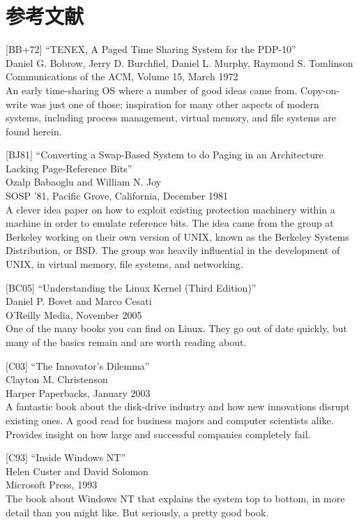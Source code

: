 \hypertarget{ux53c2ux8003ux6587ux732e-15}{%
\section*{参考文献}\label{ux53c2ux8003ux6587ux732e-15}}

{[}BB+72{]} ``TENEX, A Paged Time Sharing System for the PDP-10''\\
Daniel G. Bobrow, Jerry D. Burchfiel, Daniel L. Murphy, Raymond S.
Tomlinson\\
Communications of the ACM, Volume 15, March 1972\\
An early time-sharing OS where a number of good ideas came from.
Copy-on-write was just one of those; inspiration for many other aspects
of modern systems, including process management, virtual memory, and
file systems are found herein.

{[}BJ81{]} ``Converting a Swap-Based System to do Paging in an
Architecture Lacking Page-Reference Bits''\\
Ozalp Babaoglu and William N. Joy\\
SOSP '81, Pacific Grove, California, December 1981\\
A clever idea paper on how to exploit existing protection machinery
within a machine in order to emulate reference bits. The idea came from
the group at Berkeley working on their own version of UNIX, known as the
Berkeley Systems Distribution, or BSD. The group was heavily influential
in the development of UNIX, in virtual memory, file systems, and
networking.

{[}BC05{]} ``Understanding the Linux Kernel (Third Edition)''\\
Daniel P. Bovet and Marco Cesati\\
O'Reilly Media, November 2005\\
One of the many books you can find on Linux. They go out of date
quickly, but many of the basics remain and are worth reading about.

{[}C03{]} ``The Innovator's Dilemma''\\
Clayton M. Christenson\\
Harper Paperbacks, January 2003\\
A fantastic book about the disk-drive industry and how new innovations
disrupt existing ones. A good read for business majors and computer
scientists alike. Provides insight on how large and successful companies
completely fail.

{[}C93{]} ``Inside Windows NT''\\
Helen Custer and David Solomon\\
Microsoft Press, 1993\\
The book about Windows NT that explains the system top to bottom, in
more detail than you might like. But seriously, a pretty good book.

